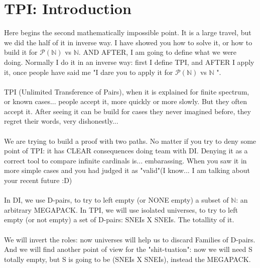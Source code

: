 \chapter{TPI: Introduction}

	\noindent
	Here begins the second mathematically impossible point. It is a large travel, but we did the half of it in inverse way. I have showed you how to solve it, or how to build it for $\mathcal{P(\mathbb{N})}$ vs $\mathbb{N}$. AND AFTER, I am going to define what we were doing. Normally I do it in an inverse way: first I define TPI, and AFTER I apply it, once people have said me "I dare you to apply it for $\mathcal{P(\mathbb{N})}$ vs $\mathbb{N}$ ".
	\\\\
	
	\noindent
	TPI (Unlimited Transference of Pairs), when it is explained for finite spectrum, or known cases... people accept it, more quickly or more slowly. But they often accept it. After seeing it can be build for cases they never imagined before, they regret their words, very dishonestly...
	\\\\
	
	\noindent
	We are trying to build a proof with two paths. No matter if you try to deny some point of TPI: it has CLEAR consequences doing team with DI. Denying it as a correct tool to compare infinite cardinals is... embarassing. When you saw it in more simple cases and you had judged it as "valid"(I know... I am talking about your recent future :D)
	\\\\
	
	\noindent
	In DI, we use D-pairs, to try to left empty (or NONE empty) a subset of $\mathbb{N}$: an arbitrary MEGAPACK. In TPI, we will use isolated universes, to try to left empty (or not empty) a set of D-pairs: SNEIs X SNEIs. The totallity of it.
	\\\\
	
	\noindent
	We will invert the roles: now universes will help us to discard Families of D-pairs. And we will find another point of view for the "shit-tuation": now we will need S totally empty, but S is going to be (SNEIs X SNEIs), instead the MEGAPACK.
	\\\\
	
